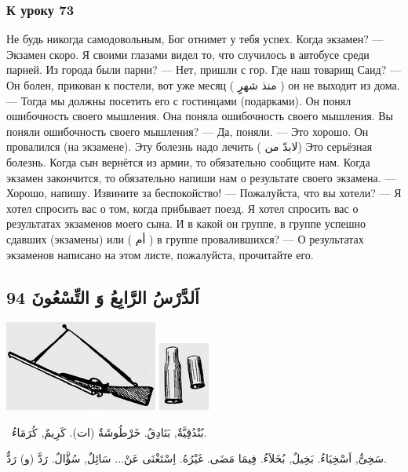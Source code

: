 \documentclass[a5paper]{article}
\begin{document}
\subsubsection{К уроку 73}
Не будь никогда самодовольным, Бог отнимет у тебя успех. Когда экзамен? — Экзамен скоро. Я своими глазами видел то, что случилось в автобусе среди парней. Из города были парни? — Нет, пришли с гор. Где наш товарищ Саид? — Он болен, прикован к постели, вот уже месяц ( منذ شهرٍ ) он не выходит из дома. — Тогда мы должны посетить его с гостинцами (подарками). Он понял ошибочность своего мышления. Она поняла ошибочность своего мышления. Вы поняли ошибочность своего мышления? — Да, поняли. — Это хорошо. Он провалился (на экзамене). Эту болезнь надо лечить ( لابدّ من) Это серьёзная болезнь. Когда сын вернётся из армии, то обязательно сообщите нам. Когда экзамен закончится, то обязательно напиши нам о результате своего экзамена. — Хорошо, напишу. Извините за беспокойство! — Пожалуйста, что вы хотели? — Я хотел спросить вас о том, когда прибывает поезд. Я хотел спросить вас о результатах экзаменов моего сына. И в какой он группе, в группе успешно сдавших (экзамены) или ( أم ) в группе провалившихся? — О результатах экзаменов написано на этом листе, пожалуйста, прочитайте его.

\subsection{اَلدَّرْسُ الرَّابِعُ وَ التِّسْعُونَ 94}
 \includegraphics[width=1.9791in,height=1.1665in]{images/MuhammadBagauddinprettified-img266.png}   \includegraphics[width=0.6563in,height=0.8854in]{images/MuhammadBagauddinprettified-img267.png} 

\ بُنْدُقِيَّةٌ, بَنَادِقُ. خَرْطُوشَةٌ (ات). كَرِيمٌ, كُرَمَاءُ. 

سَخِىٌّ, اَسْخِيَاءُ. بَخِيلٌ, بُخَلاَءُ. فِيمَا مَضَى. غَيْرُهُ. اِسْتَغْنَى عَنْ... سَائِلٌ, سُؤَّالٌ. رَدَّ (و) رَدٌّ. 
\end{document}
